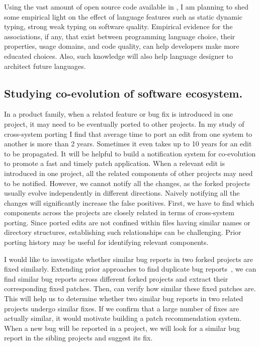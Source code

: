 \documentclass[a4paper, 11pt]{article}
\begin{document}
\begin{small}
Using the vast amount of open source code available  in \gh, I am planning to shed some empirical light 
on the effect of language features such as static \vs dynamic typing, strong \vs weak typing on software quality. 
Empirical evidence for the associations,  if any,  that exist between programming language
choice, their properties, usage domains, and code quality, can help developers make more
educated choices. Also, such knowledge will also help language designer to architect future languages.


\subsection*{\small Studying co-evolution of software ecosystem.}
In a product family, when a related feature or bug fix is introduced in one project, it may need to be eventually ported to other projects.
In my study of cross-system porting I find that average time to port an edit from one system to another is more than 2 years.
 Sometimes it even takes up to 10 years for an edit to be propagated. It will be helpful to build a notification system 
 for co-evolution to promote a fast and timely patch application. When a relevant edit is introduced in one project, all the related components of other projects may need to be notified. However, we cannot notify all the changes, as the forked projects usually evolve independently in different directions. Naively notifying all the changes will significantly increase the false positives. First, we have to find which components across the projects are closely related in terms of cross-system porting. Since ported edits are not confined within files having similar names or directory structures, establishing such relationships can be challenging. Prior porting history may be useful for identifying relevant components. 

I would like to investigate whether similar bug reports in two forked projects are fixed similarly. Extending prior approaches to find duplicate bug reports~\cite{dupBugReport:Wang:ICSE2008,dupBugReport:Nguyen:ASE2012}, we can find similar bug reports across different forked projects and extract their corresponding fixed patches. Then, {\rep} can verify how similar these fixed patches are.
This will help us to determine whether two similar bug reports in two related projects undergo similar fixes. If we confirm that a large number of fixes are actually similar, it would motivate building a patch recommendation system. When a new bug will be reported in a project, we will look for a similar bug report in the  sibling projects and suggest its fix. 


\end{small}
\end{document}

